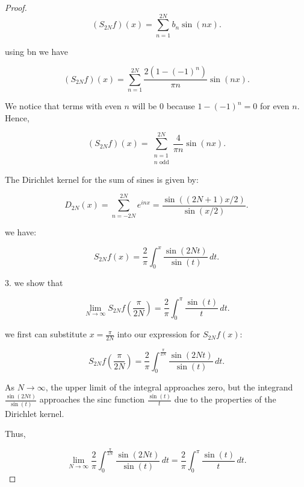 \documentclass{article}
\begin{document}
\begin{proof}
\[
(S_{2N}f)(x) = \sum_{n=1}^{2N} b_n \sin(nx).
\]

using bn we have 

\[
(S_{2N}f)(x) = \sum_{n=1}^{2N} \frac{2(1 - (-1)^n)}{\pi n} \sin(nx).
\]

We notice that terms with even \(n\) will be 0  because \(1 - (-1)^n = 0\) for even \(n\). Hence,

\[
(S_{2N}f)(x) = \sum_{\substack{n=1 \\ n \text{ odd}}}^{2N} \frac{4}{\pi n} \sin(nx).
\]

The Dirichlet kernel for the sum of sines is given by:

\[
D_{2N}(x) = \sum_{n=-2N}^{2N} e^{inx} = \frac{\sin((2N+1)x/2)}{\sin(x/2)}.
\]

we have:

\[
S_{2N}f(x) = \frac{2}{\pi} \int_{0}^{x} \frac{\sin(2Nt)}{\sin(t)} \, dt.
\]


3. 
we show that 

\[
\lim_{N \to \infty} S_{2N}f\left(\frac{\pi}{2N}\right) = \frac{2}{\pi} \int_{0}^{\pi} \frac{\sin(t)}{t} \, dt.
\]

we first can substitute \(x = \frac{\pi}{2N}\) into our expression for \(S_{2N}f(x)\):

\[
S_{2N}f\left(\frac{\pi}{2N}\right) = \frac{2}{\pi} \int_{0}^{\frac{\pi}{2N}} \frac{\sin(2Nt)}{\sin(t)} \, dt.
\]

As \(N \to \infty\), the upper limit of the integral approaches zero, but the integrand \(\frac{\sin(2Nt)}{\sin(t)}\) approaches the sinc function \(\frac{\sin(t)}{t}\) due to the properties of the Dirichlet kernel.

Thus,

\[
\lim_{N \to \infty} \frac{2}{\pi} \int_{0}^{\frac{\pi}{2N}} \frac{\sin(2Nt)}{\sin(t)} \, dt = \frac{2}{\pi} \int_{0}^{\pi} \frac{\sin(t)}{t} \, dt.
\]


\end{proof}
\end{document}
